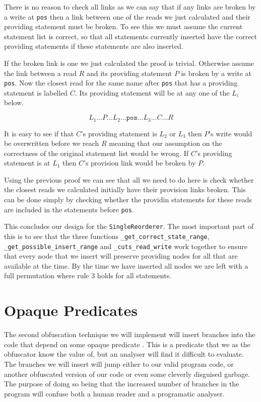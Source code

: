 \documentclass{report}
\begin{document}
\begin{description}
There is no reason to check all links as we can say that if any links are broken by a write at \texttt{pos} then a link between one of the reads we just
calculated and their providing statement must be broken. To see this we must assume the current statement list is correct, so that all statements currently
inserted have the correct providing statements if these statements are also inserted.

If the broken link is one we just calculated the proof is trivial. Otherwise assume the link between a read $R$ and its providing statement $P$ is broken
by a write at \texttt{pos}. Now the closest read for the same name after \texttt{pos} that has a providing statement is labelled $C$. Its providing
statement will be at any one of the $L_i$ below.

$$L_1 \ldots P \ldots L_2 \ldots \mathtt{pos} \ldots L_3 \ldots C \ldots R$$

It is easy to see if that $C$'s providing statement is $L_2$ or $L_3$ then $P$'s write would be overwritten before we reach $R$ meaning that our assumption
on the correctness of the original statement list would be wrong. If $C$'s providing statement is at $L_1$ then $C$'s provision link would be broken by $P$.

Using the previous proof we can see that all we need to do here is check whether the closest reads we calculated initially have their provision links broken.
This can be done simply by checking whether the providin statements for these reads are included in the statements before \texttt{pos}.

\end{description}

This concludes our design for the \texttt{SingleReorderer}. The most important part of this is to see that the three functions
\texttt{\_get\_correct\_state\_range}, \texttt{\_get\_possible\_insert\_range} and \texttt{\_cuts\_read\_write} work together to ensure that every node that
we insert will preserve providing nodes for all that are available at the time. By the time we have inserted all nodes we are left with a full permutation
where rule 3 holds for all statements.

\section{Opaque Predicates}

The second obfuscation technique we will implement will insert branches into the code that depend on
some opaque predicate \cite{taxobftrans}. This is a predicate that we as the obfuscator know the value of,
but an analyser will find it difficult to evaluate. The branches we will insert will jump either to our valid
program code, or another obfuscated version of our code or even some cleverly disguised garbage. The purpose of doing so being
that the increased number of branches in the program will confuse both a human reader and a programatic analyser.
\end{document}
